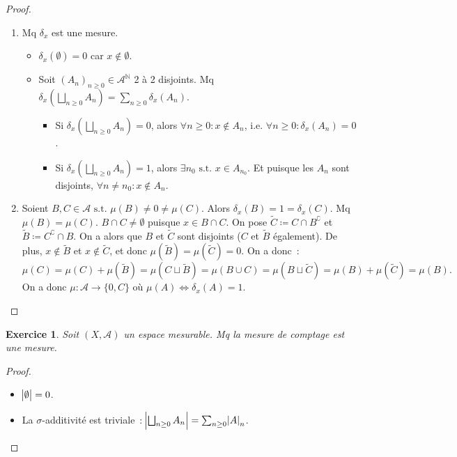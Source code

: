 \documentclass{article}
\newtheorem{ex}{Exercice}[section]
\newcommand{\st}{\text{ s.t. }}
\newcommand{\C}{\complement}
\newcommand{\N}{{\mathbb N}}
\begin{document}
\begin{proof}~
\begin{enumerate}
	\item Mq $\delta_x$ est une mesure.
	\begin{itemize}
		\item $\delta_x(\emptyset) = 0$ car $x \not \in \emptyset$.
		\item Soit $(A_n)_{n \geq 0} \in \mathcal A^\N$ 2 à 2 disjoints. Mq $\delta_x(\bigsqcup_{n \geq 0}A_n) = \sum_{n \geq 0}\delta_x(A_n)$.
		\begin{itemize}
			\item Si $\delta_x(\bigsqcup_{n \geq 0}A_n) = 0$, alors $\forall n \geq 0 : x \not \in A_n$, i.e. $\forall n \geq 0 : \delta_x(A_n) = 0$.
			\item Si $\delta_x(\bigsqcup_{n \geq 0}A_n) = 1$, alors $\exists n_0 \st x \in A_{n_0}$. Et puisque les $A_n$ sont disjoints, $\forall n \neq n_0 : x \not \in A_n$.
		\end{itemize}
	\end{itemize}
	\item Soient $B, C \in \mathcal A \st \mu(B) \neq 0 \neq \mu(C)$. Alors $\delta_x(B) = 1 = \delta_x(C)$. Mq $\mu(B) = \mu(C)$. $B \cap C \neq \emptyset$ puisque $x \in B \cap C$.
	On pose $\tilde C \coloneqq C \cap B^\C$ et $\tilde B \coloneqq C^\C \cap B$. On a alors que $B$ et $\tilde C$ sont disjoints ($C$ et $\tilde B$ également).
	De plus, $x \not \in \tilde B$ et $x \not \in \tilde C$, et donc $\mu(\tilde B) = \mu(\tilde C) = 0$. On a donc~:
	\[\mu(C) = \mu(C) + \mu(\tilde B) = \mu(C \sqcup \tilde B) = \mu(B \cup C) = \mu(B \sqcup \tilde C) = \mu(B) + \mu(\tilde C) = \mu(B).\]
	On a donc $\mu : \mathcal A \to \{0, C\}$ où $\mu(A) \iff \delta_x(A) = 1$.
\end{enumerate}
\end{proof}

\begin{ex} Soit $(X, \mathcal A)$ un espace mesurable. Mq la mesure de comptage est une mesure.
\end{ex}

\begin{proof}~
\begin{itemize}
	\item $\abs \emptyset = 0$.
	\item La $\sigma$-additivité est triviale~: $\abs {\bigsqcup_{n \geq 0}A_n} = \sum_{n \geq 0}\abs A_n$.
\end{itemize}
\end{proof}
\end{document}
